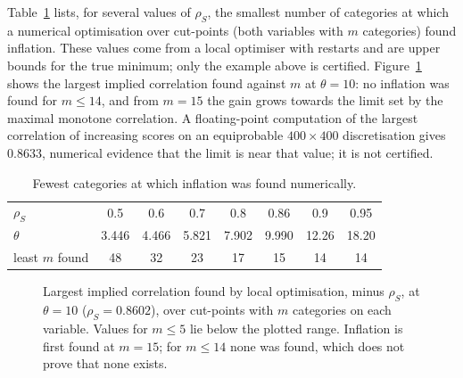 \documentclass[11pt]{amsart}
\theoremstyle{definition}
\DeclareMathOperator{\corr}{corr}
\newcommand{\rs}{\rho_S}
\begin{document}
Table~\ref{tab:mstar} lists, for several values of $\rs$, the smallest number of categories at which a numerical
optimisation over cut-points (both variables with $m$ categories) found inflation. These values come from a local
optimiser with restarts and are upper bounds for the true minimum; only the example above is certified.
Figure~\ref{fig:gap} shows the largest implied correlation found against $m$ at $\theta=10$: no inflation was found
for $m\le14$, and from $m=15$ the gain grows towards the limit set by the maximal monotone correlation. A
floating-point computation of the largest correlation of increasing scores on an equiprobable $400\times400$
discretisation gives $0.8633$, numerical evidence that the limit is near that value; it is not certified.

\begin{table}[h]
\centering\small
\begin{tabular}{@{}lccccccc@{}}
\toprule
$\rs$ & 0.5 & 0.6 & 0.7 & 0.8 & 0.86 & 0.9 & 0.95\\
$\theta$ & 3.446 & 4.466 & 5.821 & 7.902 & 9.990 & 12.26 & 18.20\\
\midrule
least $m$ found & 48 & 32 & 23 & 17 & 15 & 14 & 14\\
\bottomrule
\end{tabular}
\caption{Fewest categories at which inflation was found numerically.}\label{tab:mstar}
\end{table}

\begin{figure}[t]
\centering
{}
\caption{Largest implied correlation found by local optimisation, minus $\rs$, at $\theta=10$ ($\rs=0.8602$), over
cut-points with $m$ categories on each variable. Values for $m\le5$ lie below the plotted range. Inflation is first
found at $m=15$; for $m\le14$ none was found, which does not prove that none exists.}\label{fig:gap}
\end{figure}
\end{document}
